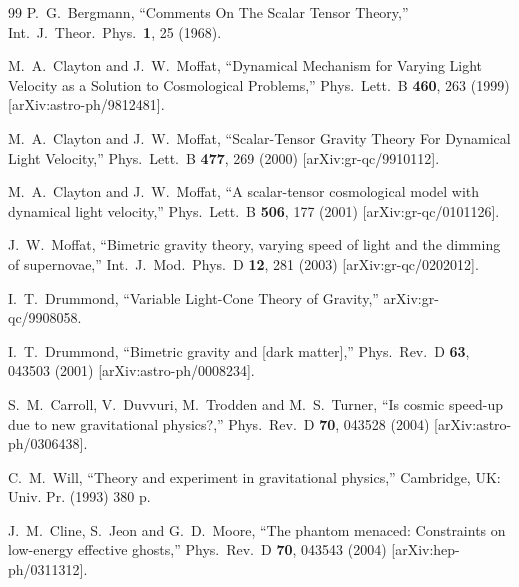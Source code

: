 \begin{thebibliography}{99}
  P.~G.~Bergmann,
  ``Comments On The Scalar Tensor Theory,''
  Int.\ J.\ Theor.\ Phys.\  {\bf 1}, 25 (1968).

  M.~A.~Clayton and J.~W.~Moffat,
   ``Dynamical Mechanism for Varying Light Velocity as a Solution to
  Cosmological Problems,''
  Phys.\ Lett.\ B {\bf 460}, 263 (1999)
  [arXiv:astro-ph/9812481].

  M.~A.~Clayton and J.~W.~Moffat,
  ``Scalar-Tensor Gravity Theory For Dynamical Light Velocity,''
  Phys.\ Lett.\ B {\bf 477}, 269 (2000)
  [arXiv:gr-qc/9910112].

  M.~A.~Clayton and J.~W.~Moffat,
  ``A scalar-tensor cosmological model with dynamical light velocity,''
  Phys.\ Lett.\ B {\bf 506}, 177 (2001)
  [arXiv:gr-qc/0101126].

  J.~W.~Moffat,
   ``Bimetric gravity theory, varying speed of light and the dimming of
  supernovae,''
  Int.\ J.\ Mod.\ Phys.\ D {\bf 12}, 281 (2003)
  [arXiv:gr-qc/0202012].

  I.~T.~Drummond,
  ``Variable Light-Cone Theory of Gravity,''
  arXiv:gr-qc/9908058.

  I.~T.~Drummond,
  ``Bimetric gravity and [dark matter],''
  Phys.\ Rev.\ D {\bf 63}, 043503 (2001)
  [arXiv:astro-ph/0008234].

  S.~M.~Carroll, V.~Duvvuri, M.~Trodden and M.~S.~Turner,
  ``Is cosmic speed-up due to new gravitational physics?,''
  Phys.\ Rev.\ D {\bf 70}, 043528 (2004)
  [arXiv:astro-ph/0306438].

  C.~M.~Will,
  ``Theory and experiment in gravitational physics,''
	Cambridge, UK: Univ. Pr. (1993) 380 p.

  J.~M.~Cline, S.~Jeon and G.~D.~Moore,
  ``The phantom menaced: Constraints on low-energy effective ghosts,''
  Phys.\ Rev.\ D {\bf 70}, 043543 (2004)
  [arXiv:hep-ph/0311312].


\end{thebibliography}

